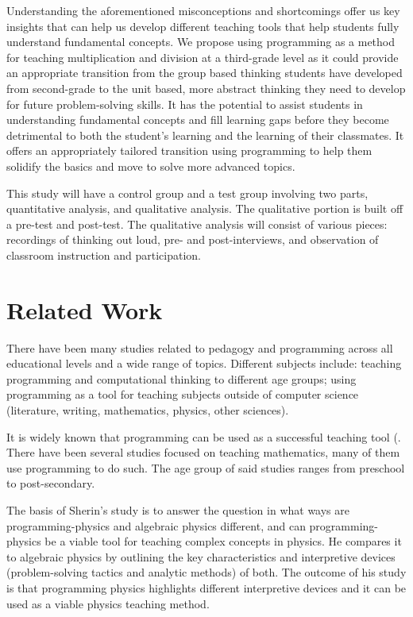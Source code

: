 \documentclass[12pt]{extarticle}
\begin{document}
Understanding the aforementioned misconceptions and shortcomings offer us key insights that can help us develop different teaching tools that help students fully understand fundamental concepts. We propose using programming as a method for teaching multiplication and division at a third-grade level as it could provide an appropriate transition from the group based thinking students have developed from second-grade to the unit based, more abstract thinking they need to develop for future problem-solving skills. It has the potential to assist students in understanding fundamental concepts and fill learning gaps before they become detrimental to both the student’s learning and the learning of their classmates.  It offers an appropriately tailored transition using programming to help them solidify the basics and move to solve more advanced topics.

This study will have a control group and a test group involving two parts, quantitative analysis, and qualitative analysis. The qualitative portion is built off a pre-test and post-test. The qualitative analysis will consist of various pieces: recordings of thinking out loud, pre- and post-interviews, and observation of classroom instruction and participation.  

\section*{Related Work}
There have been many studies related to pedagogy and programming across all educational levels and a wide range of topics. Different subjects include: teaching programming and computational thinking to different age groups; using programming as a tool for teaching subjects outside of computer science (literature, writing, mathematics, physics, other sciences).



It is widely known that programming can be used as a successful teaching tool (. There have been several studies focused on teaching mathematics, many of them use programming to do such. The age group of said studies ranges from preschool to post-secondary. 

The basis of Sherin’s study is to answer the question in what ways are programming-physics and algebraic physics different, and can programming-physics be a viable tool for teaching complex concepts in physics. He compares it to algebraic physics by outlining the key characteristics and interpretive devices (problem-solving tactics and analytic methods) of both. The outcome of his study is that programming physics highlights different interpretive devices and it can be used as a viable physics teaching method.
\end{document}
